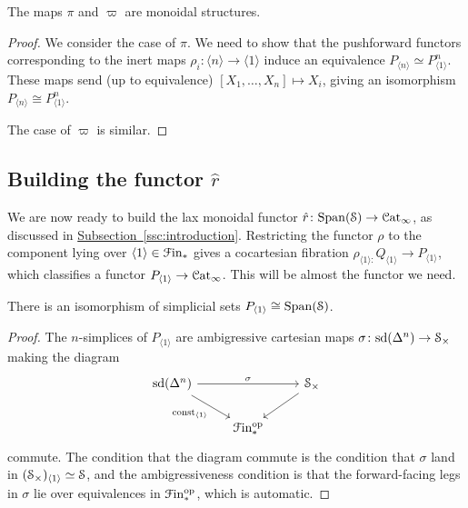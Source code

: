 \documentclass[main.tex]{subfiles}
\begin{document}
\begin{proposition}
  The maps $\pi$ and $\varpi$ are monoidal structures.
\end{proposition}
\begin{proof}
  We consider the case of $\pi$. We need to show that the pushforward functors corresponding to the inert maps $\rho_{i}\colon \langle n \rangle \to \langle 1 \rangle$ induce an equivalence $P_{\langle n \rangle} \simeq P_{\langle 1 \rangle}^{n}$. These maps send (up to equivalence) $[X_{1}, \ldots, X_{n}] \mapsto X_{i}$, giving an isomorphism $P_{\langle n \rangle} \cong P_{\langle 1 \rangle}^{n}$.

  The case of $\varpi$ is similar.
\end{proof}

\subsection{Building the functor \texorpdfstring{$\hat{r}$}{r}}
\label{ssc:building_the_functor}

We are now ready to build the lax monoidal functor $\hat{r}\colon \Span(\S) \to \ICat$, as discussed in \hyperref[ssc:introduction]{Subsection~\ref*{ssc:introduction}}. Restricting the functor $\rho$ to the component lying over $\langle 1 \rangle \in \Finp$ gives a cocartesian fibration $\rho_{\langle 1 \rangle\colon }Q_{\langle 1 \rangle} \to P_{\langle 1 \rangle}$, which classifies a functor $P_{\langle 1 \rangle} \to \ICat$. This will be almost the functor we need.

\begin{proposition}
  There is an isomorphism of simplicial sets $P_{\langle 1 \rangle} \cong \Span(\S)$.
\end{proposition}
\begin{proof}
  The $n$-simplices of $P_{\langle 1 \rangle}$ are ambigressive cartesian maps $\sigma\colon \sd(\Delta^{n}) \to \S_{\times}$ making the diagram
  \begin{equation*}
    \begin{tikzcd}
      \sd(\Delta^{n})
      \arrow[rr, "\sigma"]
      \arrow[dr, swap, "\const_{\langle 1 \rangle}"]
      && \S_{\times}
      \arrow[dl]
      \\
      & \Finp\op
    \end{tikzcd}
  \end{equation*}
  commute. The condition that the diagram commute is the condition that $\sigma$ land in $(\S_{\times})_{\langle 1 \rangle} \simeq \S$, and the ambigressiveness condition is that the forward-facing legs in $\sigma$ lie over equivalences in $\Finp\op$, which is automatic.
\end{proof}
\end{document}
